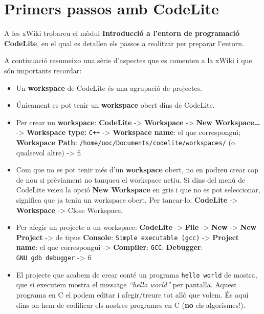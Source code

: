 \documentclass[]{book}
\providecommand{\tightlist}{%
  \setlength{\itemsep}{0pt}\setlength{\parskip}{0pt}}
\begin{document}
\section{Primers passos amb CodeLite}\label{primers-passos-amb-codelite}

A les xWiki trobareu el mòdul \textbf{Introducció a l'entorn de
programació CodeLite}, en el qual es detallen els passos a realitzar per
preparar l'entorn.

A continuació resumeixo una sèrie d'aspectes que es comenten a la xWiki
i que són importants recordar:

\begin{itemize}
\tightlist
\item
  Un \textbf{workspace} de CodeLite és una agrupació de projectes.
\item
  Únicament es pot tenir un \textbf{workspace} obert dins de CodeLite.
\item
  Per crear un \textbf{workspace}: \textbf{CodeLite} -\textgreater{}
  \textbf{Workspace} -\textgreater{} \textbf{New Workspace\ldots{}}
  -\textgreater{} \textbf{Workspace type:} \texttt{C++} -\textgreater{}
  \textbf{Workspace name}: el que correspongui; \textbf{Workspace Path}:
  \texttt{/home/uoc/Documents/codelite/workspaces/} (o qualsevol altre)
  -\textgreater{} fi
\item
  Com que no es pot tenir més d'un \textbf{workspace} obert, no en
  podreu crear cap de nou si prèviament no tanqueu el workspace actiu.
  Si dins del menú de CodeLite veieu la opció \textbf{New Workspace} en
  gris i que no es pot seleccionar, significa que ja teniu un workspace
  obert. Per tancar-lo: \textbf{CodeLite} -\textgreater{}
  \textbf{Workspace} -\textgreater{} Close Workspace.
\item
  Per afegir un projecte a un workspace: \textbf{CodeLite}
  -\textgreater{} \textbf{File} -\textgreater{} \textbf{New}
  -\textgreater{} \textbf{New Project} -\textgreater{} de tipus
  \textbf{Console}: \texttt{Simple\ executable\ (gcc)} -\textgreater{}
  \textbf{Project name}: el que correspongui -\textgreater{}
  \textbf{Compiler}: \texttt{GCC}; \textbf{Debugger}:
  \texttt{GNU\ gdb\ debugger} -\textgreater{} fi
\item
  El projecte que acabem de crear conté un programa
  \texttt{hello\ world} de mostra, que si executem mostra el missatge
  \emph{``hello world''} per pantalla. Aquest programa en C el podem
  editar i afegir/treure tot allò que volem. És aquí dins on hem de
  codificar els nostres programes en C (\textbf{no} els algorismes!).

\end{itemize}
\end{document}
